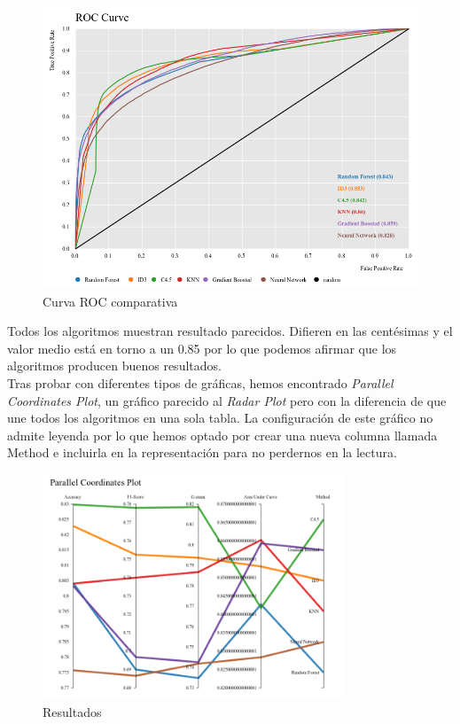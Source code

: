 	\begin{figure}[H]
		\centering
		\includegraphics[width=1\textwidth]{img/allroc.png}
		\caption{Curva ROC comparativa}
	\end{figure}


	Todos los algoritmos muestran resultado parecidos. Difieren en las centésimas y el valor medio está en torno a un 0.85 por lo que podemos afirmar que los algoritmos producen buenos resultados. \\

	\newpage 
	Tras probar con diferentes tipos de gráficas, hemos encontrado \textit{Parallel Coordinates Plot}, un gráfico parecido al \textit{Radar Plot} pero con la diferencia de que une todos los algoritmos en una sola tabla. La configuración de este gráfico no admite leyenda por lo que hemos optado por crear una nueva columna llamada Method e incluirla en la representación para no perdernos en la lectura.
	
	\begin{figure}[H]
		\centering
		\includegraphics[width=0.8\textwidth]{img/parallel2.png}
		\caption{Resultados}
	\end{figure}

